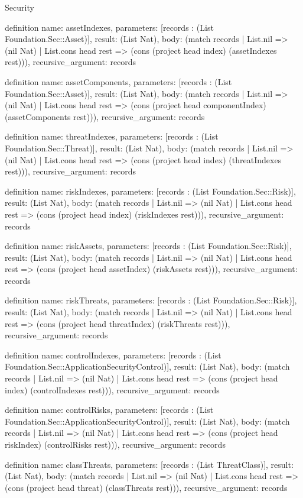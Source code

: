 \begin{lexlean}{Security}
\begin{semanticmodule}
definition{
  name: assetIndexes,
  parameters: [records : (List Foundation.Sec::Asset)],
  result: (List Nat),
  body: (match records
    | List.nil => (nil Nat)
    | List.cons head rest => (cons (project head index) (assetIndexes rest))),
  recursive_argument: records
}

definition{
  name: assetComponents,
  parameters: [records : (List Foundation.Sec::Asset)],
  result: (List Nat),
  body: (match records
    | List.nil => (nil Nat)
    | List.cons head rest => (cons (project head componentIndex) (assetComponents rest))),
  recursive_argument: records
}

definition{
  name: threatIndexes,
  parameters: [records : (List Foundation.Sec::Threat)],
  result: (List Nat),
  body: (match records
    | List.nil => (nil Nat)
    | List.cons head rest => (cons (project head index) (threatIndexes rest))),
  recursive_argument: records
}

definition{
  name: riskIndexes,
  parameters: [records : (List Foundation.Sec::Risk)],
  result: (List Nat),
  body: (match records
    | List.nil => (nil Nat)
    | List.cons head rest => (cons (project head index) (riskIndexes rest))),
  recursive_argument: records
}

definition{
  name: riskAssets,
  parameters: [records : (List Foundation.Sec::Risk)],
  result: (List Nat),
  body: (match records
    | List.nil => (nil Nat)
    | List.cons head rest => (cons (project head assetIndex) (riskAssets rest))),
  recursive_argument: records
}

definition{
  name: riskThreats,
  parameters: [records : (List Foundation.Sec::Risk)],
  result: (List Nat),
  body: (match records
    | List.nil => (nil Nat)
    | List.cons head rest => (cons (project head threatIndex) (riskThreats rest))),
  recursive_argument: records
}

definition{
  name: controlIndexes,
  parameters: [records : (List Foundation.Sec::ApplicationSecurityControl)],
  result: (List Nat),
  body: (match records
    | List.nil => (nil Nat)
    | List.cons head rest => (cons (project head index) (controlIndexes rest))),
  recursive_argument: records
}

definition{
  name: controlRisks,
  parameters: [records : (List Foundation.Sec::ApplicationSecurityControl)],
  result: (List Nat),
  body: (match records
    | List.nil => (nil Nat)
    | List.cons head rest => (cons (project head riskIndex) (controlRisks rest))),
  recursive_argument: records
}

definition{
  name: classThreats,
  parameters: [records : (List ThreatClass)],
  result: (List Nat),
  body: (match records
    | List.nil => (nil Nat)
    | List.cons head rest => (cons (project head threat) (classThreats rest))),
  recursive_argument: records
}


\end{semanticmodule}
\end{lexlean}

